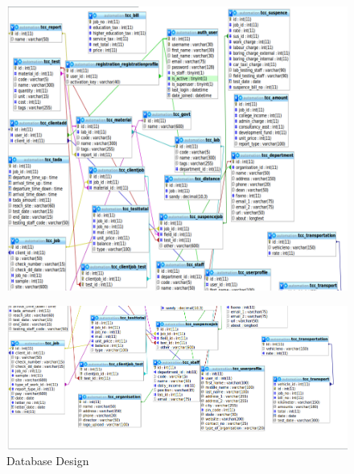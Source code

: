 \begin{figure}[h]
\centering \includegraphics[scale=0.5]{db1.png}

\end{figure}
\newpage
\begin{figure}[h]
\centering \includegraphics[scale=0.5]{db2.png}
\caption{Database Design}
\end{figure}
\newpage
